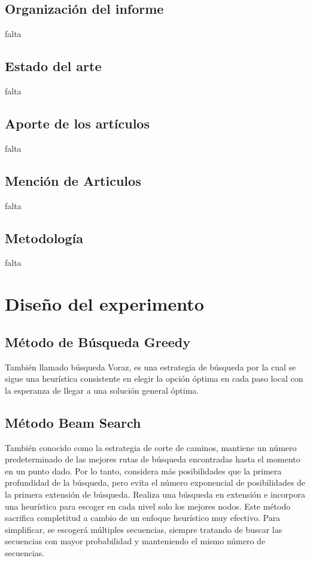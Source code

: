\documentclass[10pt,twocolumn]{article}
\theoremstyle{definition}
\begin{document}
\subsection{Organización del informe}
falta

\subsection{Estado del arte}
falta

\subsection{Aporte de los artículos }
falta

\subsection{Mención de Articulos}
falta

\subsection{Metodología}
falta


\section{Diseño del experimento}


\subsection{Método de Búsqueda Greedy}
También llamado búsqueda Voraz, es una estrategia de búsqueda por la cual se sigue una heurística consistente en elegir la opción óptima en cada paso local con la esperanza de llegar a una solución general óptima.

\subsection{Método Beam Search}
También conocido como la estrategia de corte de caminos, mantiene un número predeterminado de las mejores rutas de búsqueda encontradas hasta el momento en un punto dado. Por lo tanto, considera más posibilidades que la primera profundidad de la búsqueda, pero evita el número exponencial de posibilidades de la primera extensión de búsqueda.
Realiza una búsqueda en extensión e incorpora una heurística para escoger en cada nivel solo los mejores nodos. Este método sacrifica completitud a cambio de un enfoque heurístico muy efectivo. Para simplificar, se escogerá múltiples secuencias, siempre tratando de buscar las secuencias con mayor probabilidad y manteniendo el mismo número de secuencias.
\end{document}
